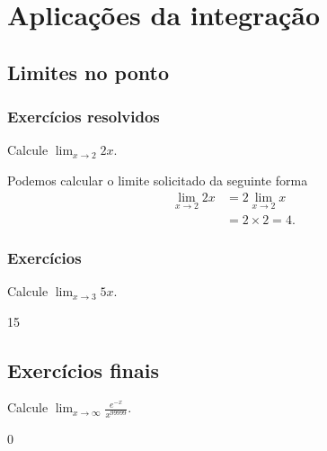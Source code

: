 
\chapter{Aplicações da integração}\label{cap:apl_integracao}

\emconstrucao

\section{Limites no ponto}

\construirSec

\subsection*{Exercícios resolvidos}

\construirExeresol

\begin{exeresol}
  Calcule $\lim_{x\to 2} 2x$.
\end{exeresol}
\begin{resol}
  Podemos calcular o limite solicitado da seguinte forma
  \begin{equation}
    \begin{split}
      \lim_{x\to 2} 2x &= 2\lim_{x\to 2} x\\
      &= 2\times 2 = 4.
    \end{split}
  \end{equation}
\end{resol}

\subsection*{Exercícios}

\construirExer

\begin{exer}
  Calcule $\lim_{x\to 3} 5x$.
\end{exer}
\begin{resp}
  15
\end{resp}

\section{Exercícios finais}

\construirExer

\begin{exer}
  Calcule $\displaystyle\lim_{x\to \infty} \frac{e^{-x}}{x^{99999}}$.
\end{exer}
\begin{resp}
  0
\end{resp}


